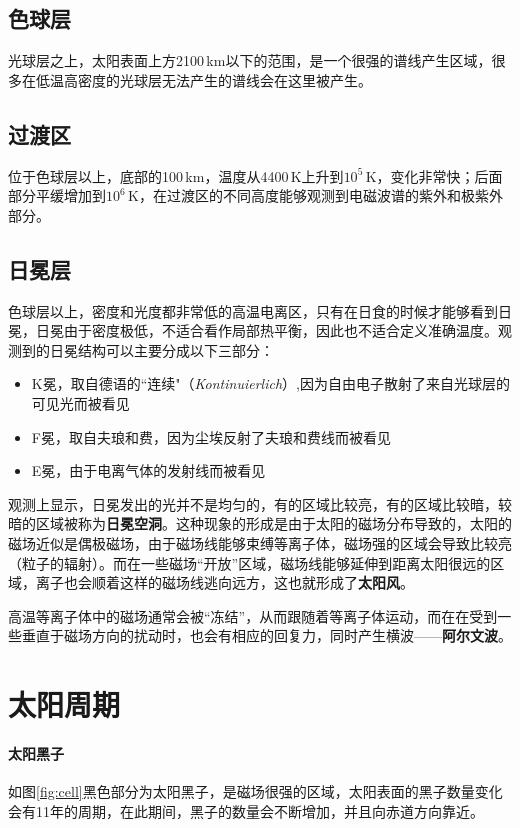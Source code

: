 \documentclass[openany]{ctexbook}
\begin{document}
\subsection{色球层}
光球层之上，太阳表面上方2100\,km以下的范围，是一个很强的谱线产生区域，很多在低温高密度的光球层无法产生的谱线会在这里被产生。

\subsection{过渡区}
位于色球层以上，底部的100\,km，温度从4400\,K上升到$10^5$\,K，变化非常快；后面部分平缓增加到$10^6$\,K，在过渡区的不同高度能够观测到电磁波谱的紫外和极紫外部分。

\subsection{日冕层}
色球层以上，密度和光度都非常低的高温电离区，只有在日食的时候才能够看到日冕，日冕由于密度极低，不适合看作局部热平衡，因此也不适合定义准确温度。观测到的日冕结构可以主要分成以下三部分：
\begin{itemize}
  \item K冕，取自德语的``连续"（\textit{Kontinuierlich}）,因为自由电子散射了来自光球层的可见光而被看见
  \item F冕，取自夫琅和费，因为尘埃反射了夫琅和费线而被看见
  \item E冕，由于电离气体的发射线而被看见
\end{itemize}

观测上显示，日冕发出的光并不是均匀的，有的区域比较亮，有的区域比较暗，较暗的区域被称为\textbf{日冕空洞}。这种现象的形成是由于太阳的磁场分布导致的，太阳的磁场近似是偶极磁场，由于磁场线能够束缚等离子体，磁场强的区域会导致比较亮（粒子的辐射）。而在一些磁场``开放''区域，磁场线能够延伸到距离太阳很远的区域，离子也会顺着这样的磁场线逃向远方，这也就形成了\textbf{太阳风}。

高温等离子体中的磁场通常会被``冻结''，从而跟随着等离子体运动，而在在受到一些垂直于磁场方向的扰动时，也会有相应的回复力，同时产生横波——\textbf{阿尔文波}。

\section{太阳周期}
\paragraph{太阳黑子}
如图\ref{fig:cell}黑色部分为太阳黑子，是磁场很强的区域，太阳表面的黑子数量变化会有11年的周期，在此期间，黑子的数量会不断增加，并且向赤道方向靠近。
\end{document}
